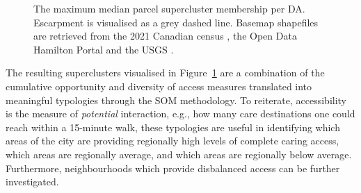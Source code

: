 \documentclass[
  authoryear,
  preprint,
  3p]{elsarticle}
\begin{document}
\begin{figure}


\caption{\label{fig-Fig8}The maximum median parcel supercluster
membership per DA. Escarpment is visualised as a grey dashed line.
Basemap shapefiles are retrieved from the 2021 Canadian census
\citep{governmentofcanadaCensusPopulation2023}, the Open Data Hamilton
Portal \citep{opendatahamiltonCityBoundary2023} and the USGS
\citep{greatlakesUSGS2010}.}

\end{figure}%

The resulting superclusters visualised in Figure~\ref{fig-Fig8} are a
combination of the cumulative opportunity and diversity of access
measures translated into meaningful typologies through the SOM
methodology. To reiterate, accessibility is the measure of
\emph{potential} interaction, e.g., how many care destinations one could
reach within a 15-minute walk, these typologies are useful in
identifying which areas of the city are providing regionally high levels
of complete caring access, which areas are regionally average, and which
areas are regionally below average. Furthermore, neighbourhoods which
provide disbalanced access can be further investigated.
\end{document}
